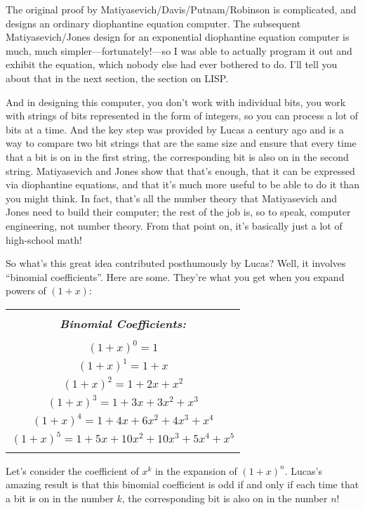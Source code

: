 \documentclass[12pt]{book}
\begin{document}
The original proof by Matiyasevich/Davis/Putnam/Robinson is complicated, and designs an
ordinary diophantine equation computer. The subsequent Matiyasevich/Jones design for
an exponential diophantine equation computer is much, much simpler---fortunately!---so 
I was able to actually program it out and exhibit the equation, 
which nobody else had ever bothered to do. 
I'll tell you about that in the next section, the section on LISP.
 
And 
in designing this computer,
you don't work with individual bits, you work with strings of bits represented in the form
of integers, so you can process a lot of bits at a time.  And the key step was provided by Lucas
a century ago and is a way to compare two bit strings that are the same size
and ensure that every time that a bit is on
in the first string, the corresponding bit is also on in the second string.  Matiyasevich and
Jones show that that's enough, 
that it can be expressed via diophantine equations, and
that it's much more useful to be able to do it than you might think.
In fact, that's all the number theory that Matiyasevich and Jones need to build their
computer; the rest of the job is, so to speak, computer engineering, not number theory.
From that point on,
it's basically just a lot of high-school math!
 
So what's this great idea contributed posthumously by Lucas? Well, it involves ``binomial coefficients''.
Here are some.  They're what you get when you expand powers of $(1 + x)$:
 
\begin{center}
\begin{tabular}{|c|}
\hline
\\
\textbf{\emph{\large Binomial Coefficients:}}
\\
\\
$(1+x)^0 = 1$
\\
$(1+x)^1 = 1 + x$
\\
$(1+x)^2 = 1 + 2x + x^2$
\\
$(1+x)^3 = 1 + 3x + 3x^2 + x^3$
\\
$(1+x)^4 = 1 + 4x + 6x^2 + 4x^3 + x^4$
\\
$(1+x)^5 = 1 + 5x + 10x^2 + 10x^3 + 5x^4 + x^5$
\\
\\
\hline
\end{tabular}
\end{center}

Let's consider the coefficient of $x^k$ in the expansion of $(1+x)^n$.
Lucas's amazing result is that this binomial coefficient is odd if and only if each time that
a bit is on in the number $k$, the corresponding bit is also on in the number $n$! 
 
\end{document}
